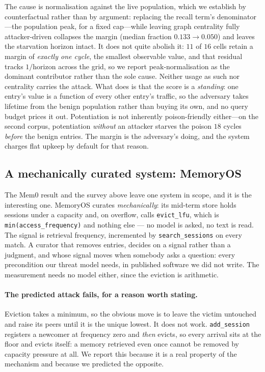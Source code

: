 The cause is normalisation against the live population, which we
establish by counterfactual rather than by argument: replacing the
recall term's denominator---the population peak, for a fixed cap---while
leaving graph centrality fully attacker-driven collapses the margin
(median fraction $0.133 \rightarrow 0.050$) and leaves the starvation
horizon intact. It does not quite abolish it: $11$ of $16$ cells retain
a margin of \emph{exactly one cycle}, the smallest observable value, and
that residual tracks $1/\text{horizon}$ across the grid, so we report
peak-normalisation as the dominant contributor rather than the sole
cause. Neither usage as such nor centrality carries the attack. What
does is that the score is a \emph{standing}: one entry's value is a
function of every other entry's traffic, so the adversary takes lifetime
from the benign population rather than buying its own, and no query
budget prices it out. Potentiation is not inherently poison-friendly
either---on the second corpus, potentiation \emph{without} an attacker
starves the poison $18$ cycles \emph{before} the benign entries. The
margin is the adversary's doing, and the system charges flat upkeep by
default for that reason.

\subsection{A mechanically curated system: MemoryOS}
\label{sec:memoryos}
The Mem0 result and the survey above leave one system in scope, and it is
the interesting one. MemoryOS \citep{kang2025memoryos} curates
\emph{mechanically}: its mid-term store holds sessions under a capacity
and, on overflow, calls \texttt{evict\_lfu}, which is
\texttt{min(access\_frequency)} and nothing else --- no model is asked,
no text is read. The signal is retrieval frequency, incremented by
\texttt{search\_sessions} on every match. A curator that removes entries,
decides on a signal rather than a judgment, and whose signal moves when
somebody asks a question: every precondition our threat model needs, in
published software we did not write. The measurement needs no model
either, since the eviction is arithmetic.

\paragraph{The predicted attack fails, for a reason worth stating.}
Eviction takes a minimum, so the obvious move is to leave the victim
untouched and raise its peers until it is the unique lowest. It does not
work. \texttt{add\_session} registers a newcomer at frequency zero and
\emph{then} evicts, so every arrival sits at the floor and evicts itself:
a memory retrieved even once cannot be removed by capacity pressure at
all. We report this because it is a real property of the mechanism and
because we predicted the opposite.

